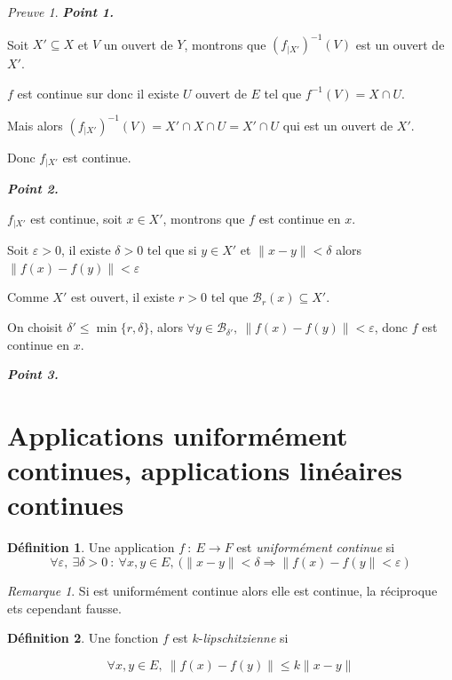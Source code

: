 \documentclass[]{article}
\theoremstyle{remark}
\newtheorem{myrem}{Remarque}
\newtheorem{myproof}{Preuve}
\theoremstyle{definition}
\newtheorem{mydef}{Définition}
\newcommand{\funcshort}[3]{
#1 ~ : ~ #2 \longrightarrow #3
}
\newenvironment{proofpart}[1]{
	\leavevmode
	
	\noindent
	{\textit{\textbf{\boldmath #1}}}
	
}{
	\checkmark
}
\begin{document}
\begin{myproof}
	\begin{proofpart}{Point 1.}
		Soit $X' \subseteq X$ et $V$ un ouvert de $Y$, montrons que $\left(f_{|X'}\right)^{-1}(V)$ est un ouvert de $X'$.
		
		$f$ est continue sur donc il existe $U$ ouvert de $E$ tel que $f^{-1}(V)= X \cap U$.
		
		Mais alors $\left(f_{|X'}\right)^{-1}(V) = X' \cap X \cap U = X' \cap U$ qui est un ouvert de $X'$.
		
		Donc $f_{|X'}$ est continue.
	\end{proofpart}
	
	\begin{proofpart}{Point 2.}
		$f_{|X'}$ est continue, soit $x \in X'$, montrons que $f$ est continue en $x$.
		
		Soit $\varepsilon > 0$, il existe $\delta
		 > 0$ tel que si $y \in X'$ et $\|x-y\| < \delta$ alors $\|f(x)-f(y)\| < \varepsilon$
		 
		 Comme $X'$ est ouvert, il existe $r > 0$ tel que $\mathcal{B}_r(x) \subseteq X'$.
		 
		 On choisit $\delta' \leqslant \min\{r, \delta\}$, alors $\forall y \in \mathcal{B}_{\delta'}, ~ \|f(x)-f(y)\| < \varepsilon$, donc $f$ est continue en $x$.
	\end{proofpart}
	
	\begin{proofpart}{Point 3.}
	\end{proofpart}
\end{myproof}


\section{Applications uniformément continues, applications linéaires continues}

\begin{mydef}
	Une application $\funcshort{f}{E}{F}$ est \textit{uniformément continue} si $$\forall \varepsilon, ~ \exists \delta > 0 ~ : ~ \forall x, y \in E, ~ (\|x-y\| < \delta \Longrightarrow \|f(x)-f(y\| < \varepsilon)$$
\end{mydef}

\begin{myrem}
	Si est uniformément continue alors elle est continue, la réciproque ets cependant fausse.
\end{myrem}

\begin{mydef}
	Une fonction $f$ est $k$-\textit{lipschitzienne} si
	
	$$\forall x, y \in E, ~ \|f(x)-f(y)\| \leqslant k \|x-y\|$$
\end{mydef}
\end{document}
